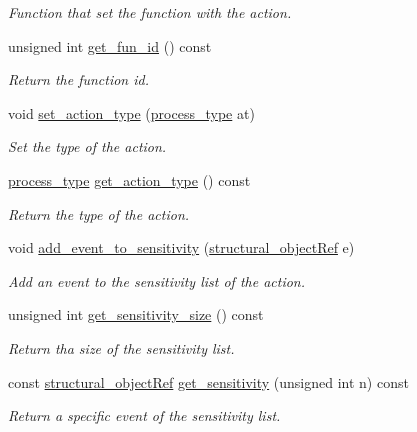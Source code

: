 \begin{DoxyCompactItemize}
\begin{DoxyCompactList}\small\item\em Function that set the function with the action. \end{DoxyCompactList}\item 
unsigned int \hyperlink{classaction__o_ac8514d6f3bbfa52b66b6ed8ad7021514}{get\+\_\+fun\+\_\+id} () const
\begin{DoxyCompactList}\small\item\em Return the function id. \end{DoxyCompactList}\item 
void \hyperlink{classaction__o_af5e89b242d1180d219eea85b3c49b4a1}{set\+\_\+action\+\_\+type} (\hyperlink{classaction__o_a72fdfe1ad9ac24109fe11bb41153b87b}{process\+\_\+type} at)
\begin{DoxyCompactList}\small\item\em Set the type of the action. \end{DoxyCompactList}\item 
\hyperlink{classaction__o_a72fdfe1ad9ac24109fe11bb41153b87b}{process\+\_\+type} \hyperlink{classaction__o_a77ad99a2be1c8edde1c2ed30972ce528}{get\+\_\+action\+\_\+type} () const
\begin{DoxyCompactList}\small\item\em Return the type of the action. \end{DoxyCompactList}\item 
void \hyperlink{classaction__o_af956630c6555c7601c84dccbb5dc22dc}{add\+\_\+event\+\_\+to\+\_\+sensitivity} (\hyperlink{structural__objects_8hpp_a8ea5f8cc50ab8f4c31e2751074ff60b2}{structural\+\_\+object\+Ref} e)
\begin{DoxyCompactList}\small\item\em Add an event to the sensitivity list of the action. \end{DoxyCompactList}\item 
unsigned int \hyperlink{classaction__o_ae18683928943e3f8fb38a609e8abc579}{get\+\_\+sensitivity\+\_\+size} () const
\begin{DoxyCompactList}\small\item\em Return tha size of the sensitivity list. \end{DoxyCompactList}\item 
const \hyperlink{structural__objects_8hpp_a8ea5f8cc50ab8f4c31e2751074ff60b2}{structural\+\_\+object\+Ref} \hyperlink{classaction__o_a52581f175528ab3ddc95b6cb2ec721b9}{get\+\_\+sensitivity} (unsigned int n) const
\begin{DoxyCompactList}\small\item\em Return a specific event of the sensitivity list. \end{DoxyCompactList}\item 

\end{DoxyCompactItemize}
